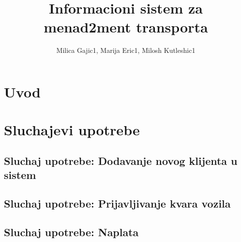 \documentclass{article}
\title{Informacioni sistem za menad2ment transporta}
\author{Milica Gajic1, Marija Eric1, Milosh Kutleshic1}
\begin{document}
\maketitle
\newpage


\renewcommand*\contentsname{Sadrz1aj}
\tableofcontents
\newpage

\section{Uvod}

\section{Sluchajevi upotrebe}
\subsection{Sluchaj upotrebe: Dodavanje novog klijenta u sistem}


\subsection{Sluchaj upotrebe: Prijavljivanje kvara vozila}

\subsection{Sluchaj upotrebe: Naplata}




\nocite{*}


\end{document}
